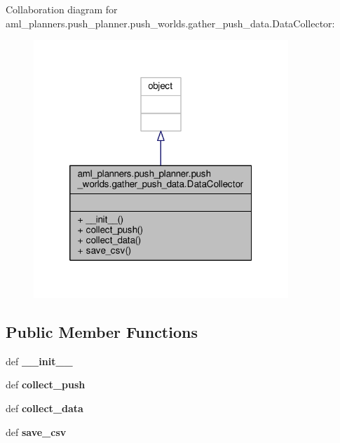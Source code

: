 Collaboration diagram for aml\-\_\-planners.\-push\-\_\-planner.\-push\-\_\-worlds.\-gather\-\_\-push\-\_\-data.\-Data\-Collector\-:
\nopagebreak
\begin{figure}[H]
\begin{center}
\leavevmode
\includegraphics[width=272pt]{classaml__planners_1_1push__planner_1_1push__worlds_1_1gather__push__data_1_1_data_collector__coll__graph}
\end{center}
\end{figure}
\subsection*{Public Member Functions}
\begin{DoxyCompactItemize}
\item 
\hypertarget{classaml__planners_1_1push__planner_1_1push__worlds_1_1gather__push__data_1_1_data_collector_a32ef2ebdca2e563bb0c2b01b46ab5df5}{def {\bfseries \-\_\-\-\_\-init\-\_\-\-\_\-}}\label{classaml__planners_1_1push__planner_1_1push__worlds_1_1gather__push__data_1_1_data_collector_a32ef2ebdca2e563bb0c2b01b46ab5df5}

\item 
\hypertarget{classaml__planners_1_1push__planner_1_1push__worlds_1_1gather__push__data_1_1_data_collector_a62331959ee0eb3b139215da97f4570f3}{def {\bfseries collect\-\_\-push}}\label{classaml__planners_1_1push__planner_1_1push__worlds_1_1gather__push__data_1_1_data_collector_a62331959ee0eb3b139215da97f4570f3}

\item 
\hypertarget{classaml__planners_1_1push__planner_1_1push__worlds_1_1gather__push__data_1_1_data_collector_aa9f92109a8bbe03c4cc523e21ca68b3a}{def {\bfseries collect\-\_\-data}}\label{classaml__planners_1_1push__planner_1_1push__worlds_1_1gather__push__data_1_1_data_collector_aa9f92109a8bbe03c4cc523e21ca68b3a}

\item 
\hypertarget{classaml__planners_1_1push__planner_1_1push__worlds_1_1gather__push__data_1_1_data_collector_a12621eaffd3bcc8de97401db941c62df}{def {\bfseries save\-\_\-csv}}\label{classaml__planners_1_1push__planner_1_1push__worlds_1_1gather__push__data_1_1_data_collector_a12621eaffd3bcc8de97401db941c62df}

\end{DoxyCompactItemize}


